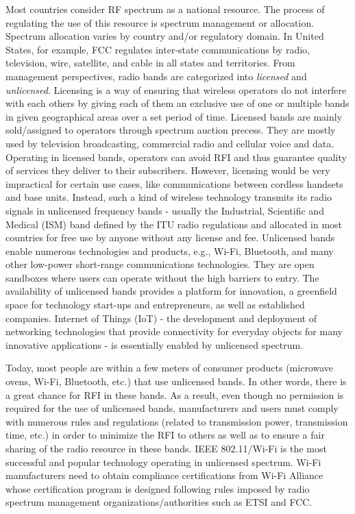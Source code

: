 Most countries consider RF spectrum as a national resource. The process of regulating the use of this resource is spectrum management or allocation. Spectrum allocation varies by country and/or regulatory domain. In United States, for example, FCC regulates inter-state communications by radio, television, wire, satellite, and cable in all states and territories. From management perspectives, radio bands are categorized into \textit{licensed} and \textit{unlicensed}. Licensing is a way of ensuring that wireless operators do not interfere with each others by giving each of them an exclusive use of one or multiple bands in given geographical areas over a set period of time. Licensed bands are mainly sold/assigned to operators through spectrum auction precess. They are mostly used by television broadcasting, commercial radio and cellular voice and data. Operating in licensed bands, operators can avoid RFI and thus guarantee quality of services they deliver to their subscribers. However, licensing would be very impractical for certain use cases, like communications between cordless handsets and base units. Instead, such a kind of wireless technology transmits its radio signals in unlicensed frequency bands - usually the Industrial, Scientific and Medical (ISM) band defined by the ITU radio regulations and allocated in most countries for free use by anyone without any license and fee. Unlicensed bands enable numerous technologies and products, e.g., Wi-Fi, Bluetooth, and many other low-power short-range communications technologies. They are open sandboxes where users can operate without the high barriers to entry. The availability of unlicensed bands provides a platform for innovation, a greenfield space for technology start-ups and entrepreneurs, as well as established companies. Internet of Things (IoT) - the development and deployment of networking technologies that provide connectivity for everyday objects for many innovative applications - is essentially enabled by unlicensed spectrum.

Today, most people are within a few meters of consumer products (microwave ovens, Wi-Fi, Bluetooth, etc.) that use unlicensed bands. In other words, there is a great chance for RFI in these bands. As a result, even though no permission is required for the use of unlicensed bands, manufacturers and users must comply with numerous rules and regulations (related to transmission power, transmission time, etc.) in order to minimize the RFI to others as well as to ensure a fair sharing of the radio resource in these bands. IEEE 802.11/Wi-Fi is the most successful and popular technology operating in unlicensed spectrum. Wi-Fi manufacturers need to obtain compliance certifications from Wi-Fi Alliance whose certification program is designed following rules imposed by radio spectrum management organizations/authorities such as ETSI and FCC. 

